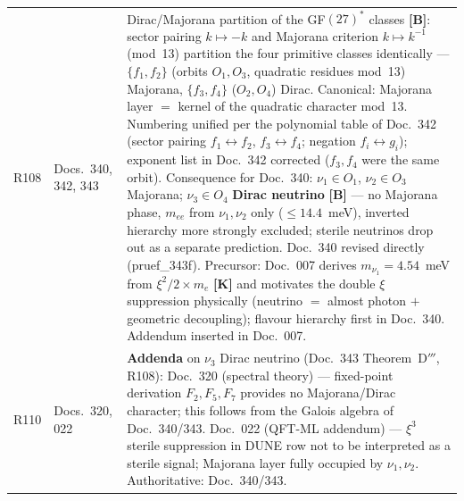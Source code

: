 \begin{longtable}{@{}p{0.9cm}p{3.1cm}p{10.2cm}@{}}
R108 & Docs.~340, 342, 343 & Dirac/Majorana partition of the GF$(27)^*$ classes \textbf{[B]}: sector pairing $k\mapsto-k$ and Majorana criterion $k\mapsto k^{-1}$ (mod~13) partition the four primitive classes identically --- $\{f_1,f_2\}$ (orbits $O_1,O_3$, quadratic residues mod~13) Majorana, $\{f_3,f_4\}$ ($O_2,O_4$) Dirac. Canonical: Majorana layer $=$ kernel of the quadratic character mod~13. Numbering unified per the polynomial table of Doc.~342 (sector pairing $f_1\leftrightarrow f_2$, $f_3\leftrightarrow f_4$; negation $f_i\leftrightarrow g_i$); exponent list in Doc.~342 corrected ($f_3,f_4$ were the same orbit). Consequence for Doc.~340: $\nu_1\in O_1$, $\nu_2\in O_3$ Majorana; $\nu_3\in O_4$ \textbf{Dirac neutrino} \textbf{[B]} --- no Majorana phase, $m_{ee}$ from $\nu_1,\nu_2$ only ($\leq14.4$~meV), inverted hierarchy more strongly excluded; sterile neutrinos drop out as a separate prediction. Doc.~340 revised directly (pruef\_343f). Precursor: Doc.~007 derives $m_{\nu_1}=4.54$~meV from $\xi^2/2\times m_e$ \textbf{[K]} and motivates the double $\xi$ suppression physically (neutrino $=$ almost photon $+$ geometric decoupling); flavour hierarchy first in Doc.~340. Addendum inserted in Doc.~007. \\
R110 & Docs.~320, 022 & \textbf{Addenda} on $\nu_3$ Dirac neutrino (Doc.~343 Theorem~D$'''$, R108): Doc.~320 (spectral theory) --- fixed-point derivation $F_2,F_5,F_7$ provides no Majorana/Dirac character; this follows from the Galois algebra of Doc.~340/343. Doc.~022 (QFT-ML addendum) --- $\xi^3$ sterile suppression in DUNE row not to be interpreted as a sterile signal; Majorana layer fully occupied by $\nu_1,\nu_2$. Authoritative: Doc.~340/343. \\

\end{longtable}
